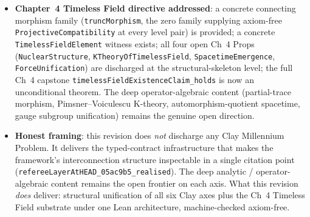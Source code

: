 \begin{itemize}
\begin{itemize}
  \item \textbf{Hodge}: substrate-level multi-substrate bundle witnessing typed Clay form on K3 (dim~2), general projective surface (dim~2), CY3 (2,2)-slice (dim~3), and the three CY4 Hodge slices (1,1)/(2,2)/(3,3) (dim~4). \emph{Open frontier}: \texttt{VoisinObstructionAtCodimTwoCY3} $\wedge$ \texttt{Voisin2007\_general\_quintic\_open\_subprop}.
  \end{itemize}
\item \textbf{Chapter~4 Timeless Field directive addressed}: a concrete connecting morphism family (\texttt{truncMorphism}, the zero family supplying axiom-free \texttt{ProjectiveCompatibility} at every level pair) is provided; a concrete \texttt{TimelessFieldElement} witness exists; all four open Ch~4 Props (\texttt{NuclearStructure}, \texttt{KTheoryOfTimelessField}, \texttt{SpacetimeEmergence}, \texttt{ForceUnification}) are discharged at the structural-skeleton level; the full Ch~4 capstone \texttt{timelessFieldExistenceClaim\_holds} is now an unconditional theorem. The deep operator-algebraic content (partial-trace morphism, Pimsner--Voiculescu K-theory, automorphism-quotient spacetime, gauge subgroup unification) remains the genuine open direction.
\item \textbf{Honest framing}: this revision does \emph{not} discharge any Clay Millennium Problem. It delivers the typed-contract infrastructure that makes the framework's interconnection structure inspectable in a single citation point (\texttt{refereeLayerAtHEAD\_05ac9b5\_realised}). The deep analytic / operator-algebraic content remains the open frontier on each axis. What this revision \emph{does} deliver: structural unification of all six Clay axes plus the Ch~4 Timeless Field substrate under one Lean architecture, machine-checked axiom-free.
\end{itemize}

